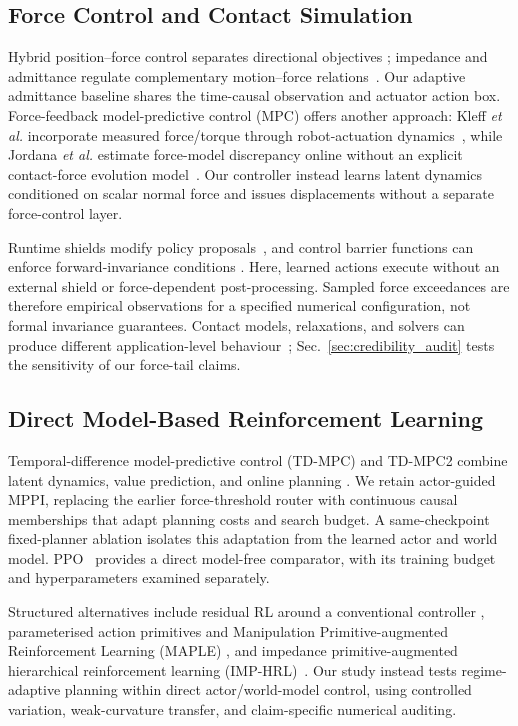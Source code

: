 \subsection{Force Control and Contact Simulation}

Hybrid position--force control separates directional objectives
\cite{raibert1981hybrid}; impedance and admittance regulate complementary
motion--force relations~\cite{hogan1985impedance,ott2010unified}. Our adaptive
admittance baseline shares the time-causal observation and actuator action box.
Force-feedback model-predictive control (MPC) offers another approach:
Kleff \emph{et al.} incorporate measured force/torque through robot-actuation
dynamics~\cite{kleff2022forcefeedbackmpc}, while Jordana \emph{et al.} estimate
force-model discrepancy online without an explicit contact-force evolution
model~\cite{jordana2024forcefeedbackmpc}. Our controller instead learns latent
dynamics conditioned on scalar normal force and issues displacements without
a separate force-control layer.

Runtime shields modify policy proposals~\cite{alshiekh2018shielding}, and
control barrier functions can enforce forward-invariance conditions
\cite{ames2019cbf,cheng2019rlcbf}. Here, learned actions execute without an
external shield or force-dependent post-processing. Sampled force exceedances
are therefore empirical observations for a specified numerical configuration,
not formal invariance guarantees. Contact models, relaxations, and solvers can
produce different application-level behaviour~\cite{lelidec2024contact};
Sec.~\ref{sec:credibility_audit} tests the sensitivity of our force-tail claims.

\subsection{Direct Model-Based Reinforcement Learning}

Temporal-difference model-predictive control (TD-MPC) and TD-MPC2 combine
latent dynamics, value prediction, and online planning
\cite{hansen2022tdmpc,hansen2024tdmpc2}. We retain actor-guided MPPI, replacing
the earlier force-threshold router with continuous causal memberships that
adapt planning costs and search budget. A same-checkpoint fixed-planner
ablation isolates this adaptation from the learned actor and world model.
PPO~\cite{schulman2017ppo} provides a direct model-free comparator, with its
training budget and hyperparameters examined separately.

Structured alternatives include residual RL around a conventional controller
\cite{johannink2019residual}, parameterised action primitives and Manipulation
Primitive-augmented Reinforcement Learning (MAPLE)
\cite{dalal2021raps,nasiriany2022maple}, and impedance primitive-augmented
hierarchical reinforcement learning (IMP-HRL)~\cite{tahmaz2025imphrl}. Our
study instead tests regime-adaptive planning within direct actor/world-model
control, using controlled variation, weak-curvature transfer, and
claim-specific numerical auditing.

